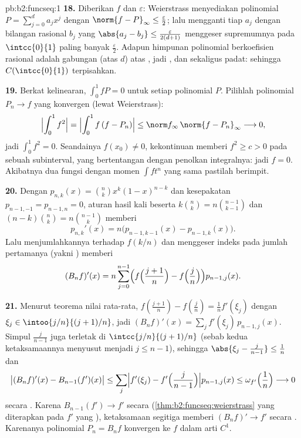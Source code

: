 \begin{solution}{pb:b2:funcseq:1}
\textbf{18.} Diberikan $f$ dan $\varepsilon$: Weierstrass menyediakan
polinomial $P = \sum_{j=0}^d a_jx^j$ dengan $\norm{f - P}_\infty \leq
\frac\varepsilon2$; lalu mengganti tiap $a_j$ dengan bilangan rasional
$b_j$ yang $\abs{a_j - b_j} \leq \frac{\varepsilon}{2(d+1)}$ menggeser
 supremumnya pada $\intcc{0}{1}$ paling banyak
$\frac\varepsilon2$. Adapun himpunan polinomial berkoefisien rasional
adalah gabungan  (atas $d$) atas , jadi
, dan sekaligus padat: sehingga $C(\intcc{0}{1})$ terpisahkan.

\textbf{19.} Berkat kelinearan, $\int_0^1 fP = 0$ untuk setiap
polinomial $P$. Pilihlah polinomial $P_n \to f$ yang konvergen 
(lewat Weierstrass):
\[
\Bigl|\int_0^1 f^2\Bigr|
= \Bigl|\int_0^1 f\,(f - P_n)\Bigr|
\leq \norm f_\infty\,\norm{f - P_n}_\infty
\longrightarrow 0 ,
\]
jadi $\int_0^1 f^2 = 0$. Seandainya $f(x_0) \neq 0$, kekontinuan memberi
$f^2 \geq c > 0$ pada sebuah subinterval, yang bertentangan dengan
penolkan integralnya: jadi $f = 0$. Akibatnya dua fungsi  dengan
momen $\int f t^n$ yang sama pastilah berimpit.

\textbf{20.} Dengan $p_{n,k}(x) = \binom nk x^k(1-x)^{n-k}$ dan
kesepakatan $p_{n-1,-1} = p_{n-1,n} = 0$, aturan hasil kali
beserta $k\binom nk = n\binom{n-1}{k-1}$ dan $(n-k)\binom nk =
n\binom{n-1}{k}$ memberi
\[
p_{n,k}'(x) = n\bigl(p_{n-1,k-1}(x) - p_{n-1,k}(x)\bigr) .
\]
Lalu menjumlahkannya terhadap $f(k/n)$ dan menggeser indeks pada jumlah
pertamanya (yakni ) memberi
\[
(B_nf)'(x) = n\sum_{j=0}^{n-1}\Bigl(f\Bigl(\frac{j+1}n\Bigr)
- f\Bigl(\frac jn\Bigr)\Bigr)p_{n-1,j}(x) .
\]

\textbf{21.} Menurut teorema nilai rata-rata, $f(\frac{j+1}n) -
f(\frac jn) = \frac1n f'(\xi_j)$ dengan $\xi_j \in
\intoo{j/n}{(j+1)/n}$, jadi $(B_nf)'(x) = \sum_j
f'(\xi_j)\,p_{n-1,j}(x)$. Simpul $\frac{j}{n-1}$ juga terletak di
$\intcc{j/n}{(j+1)/n}$ (sebab kedua ketaksamaannya menyusut menjadi $j
\leq n-1$), sehingga $\abs{\xi_j - \frac j{n-1}} \leq \frac1n$ dan
\[
\bigl|(B_nf)'(x) - B_{n-1}(f')(x)\bigr|
\leq \sum_j\Bigl|f'(\xi_j) -
f'\Bigl(\frac{j}{n-1}\Bigr)\Bigr| p_{n-1,j}(x)
\leq \omega_{f'}\Bigl(\frac1n\Bigr) \longrightarrow 0
\]
secara . Karena $B_{n-1}(f') \to f'$ secara 
(\cref{thm:b2:funcseq:weierstrass} yang diterapkan pada $f'$ yang
), ketaksamaan segitiga memberi $(B_nf)' \to f'$ secara
. Karenanya polinomial $P_n = B_nf$ konvergen ke $f$ dalam
arti $C^1$.


\end{solution}
